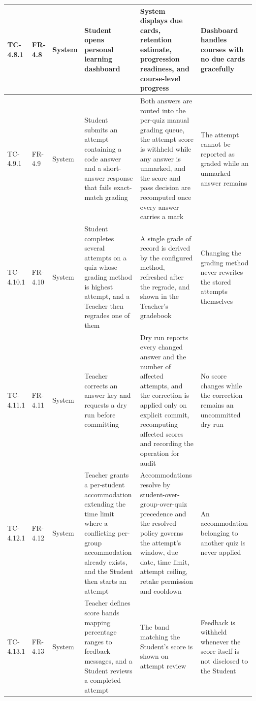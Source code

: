 \begin{longtable}{|>{\centering\arraybackslash}m{}|>{\centering\arraybackslash}m{}|>{\centering\arraybackslash}m{}|m{}|m{}|m{}|}
TC-4.8.1 & FR-4.8 & System & Student opens personal learning dashboard & System displays due cards, retention estimate, progression readiness, and course-level progress & Dashboard handles courses with no due cards gracefully \\ \hline

TC-4.9.1 & FR-4.9 & System & Student submits an attempt containing a code answer and a short-answer response that fails exact-match grading & Both answers are routed into the per-quiz manual grading queue, the attempt score is withheld while any answer is unmarked, and the score and pass decision are recomputed once every answer carries a mark & The attempt cannot be reported as graded while an unmarked answer remains \\ \hline

TC-4.10.1 & FR-4.10 & System & Student completes several attempts on a quiz whose grading method is highest attempt, and a Teacher then regrades one of them & A single grade of record is derived by the configured method, refreshed after the regrade, and shown in the Teacher's gradebook & Changing the grading method never rewrites the stored attempts themselves \\ \hline

TC-4.11.1 & FR-4.11 & System & Teacher corrects an answer key and requests a dry run before committing & Dry run reports every changed answer and the number of affected attempts, and the correction is applied only on explicit commit, recomputing affected scores and recording the operation for audit & No score changes while the correction remains an uncommitted dry run \\ \hline

TC-4.12.1 & FR-4.12 & System & Teacher grants a per-student accommodation extending the time limit where a conflicting per-group accommodation already exists, and the Student then starts an attempt & Accommodations resolve by student-over-group-over-quiz precedence and the resolved policy governs the attempt's window, due date, time limit, attempt ceiling, retake permission and cooldown & An accommodation belonging to another quiz is never applied \\ \hline

TC-4.13.1 & FR-4.13 & System & Teacher defines score bands mapping percentage ranges to feedback messages, and a Student reviews a completed attempt & The band matching the Student's score is shown on attempt review & Feedback is withheld whenever the score itself is not disclosed to the Student \\ \hline


\end{longtable}
